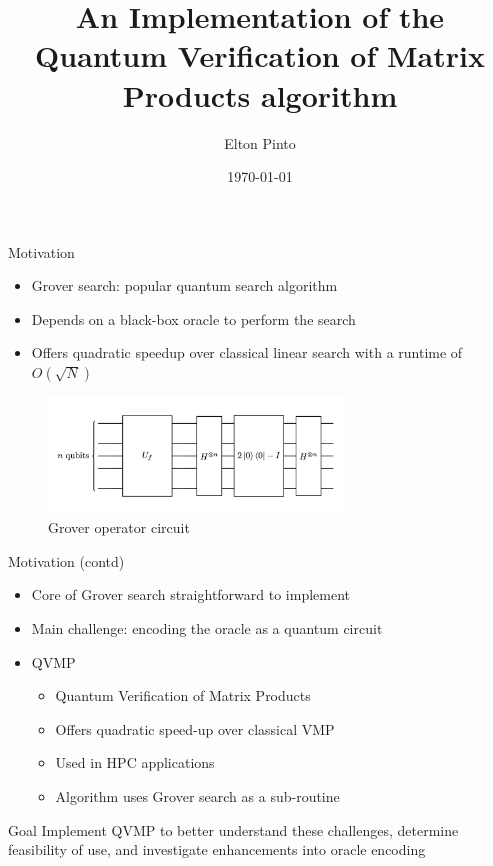 \documentclass[10pt]{beamer}
\title{An Implementation of the Quantum Verification of Matrix Products algorithm}
\author{Elton Pinto}
\date{\today}
\begin{document}
\begin{frame}[plain]
\titlepage
\end{frame}


\begin{frame}{Motivation}
  \begin{itemize}
    \item Grover search: popular quantum search algorithm
    \item Depends on a black-box oracle to perform the search
    \item Offers quadratic speedup over classical linear search with a
      runtime of $O(\sqrt{N})$
  \end{itemize}
  \begin{figure}
    \centering
    \includegraphics[width=0.7\textwidth]{assets/grover_operator.png}
    \caption{Grover operator circuit}
    \label{fig:grover_operator_circuit}
  \end{figure}
\end{frame}


\begin{frame}{Motivation (contd)}
  \begin{itemize}
    \item Core of Grover search straightforward to implement
    \item {
      Main challenge: encoding the oracle as a quantum circuit
    }
    \item {
      QVMP
      \begin{itemize}
        \item Quantum Verification of Matrix Products
        \item Offers quadratic speed-up over classical VMP
        \item Used in HPC applications
        \item Algorithm uses Grover search as a sub-routine
      \end{itemize}
    }
  \end{itemize}

  \begin{alertblock}{Goal}
    Implement QVMP to better understand these challenges, determine feasibility
    of use, and investigate enhancements into oracle encoding
  \end{alertblock}
\end{frame}
\end{document}
